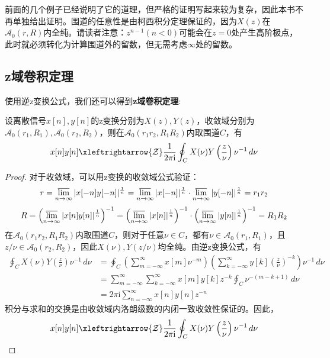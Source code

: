 前面的几个例子已经说明了它的道理，但严格的证明写起来较为复杂，因此本书不再单独给出证明。围道的任意性是由柯西积分定理保证的，因为$X(z)$在$\mathcal{A} _0(r,R)$内全纯。请读者注意：$z^{n-1}(n<0)$可能会在$z=0$处产生高阶极点，此时就必须转化为计算围道外的留数，但无需考虑$\infty$处的留数。

\subsection{z域卷积定理}\label{sub:z_convolution}

使用逆z变换公式，我们还可以得到\textbf{z域卷积定理}:
\begin{theorem}[z域卷积定理]
    设离散信号$x[n],y[n]$的z变换分别为$X(z),Y(z)$，收敛域分别为$\mathcal{A} _0(r_1,R_1),\mathcal{A} _0(r_2,R_2)$，则在$\mathcal{A} _0(r_1 r_2,R_1 R_2)$内取围道$C$，有
    \[x[n]y[n]\xleftrightarrow{\mathcal{Z}} \frac{1}{2\pi \mathrm{i}}\oint_{C}X(\nu)Y\left(\frac{z}{\nu}\right)\nu^{-1}\,d\nu\]
\end{theorem}
\begin{proof}
    对于收敛域，可以用z变换的收敛域公式验证：
    \[r=\varlimsup_{n\to\infty}|x[-n]y[-n]|^{\frac{1}{n}}=\varlimsup_{n\to\infty}|x[-n]|^{\frac{1}{n}}\cdot\varlimsup_{n\to\infty}|y[-n]|^{\frac{1}{n}}=r_1 r_2\]
    \[R=\left(\varlimsup_{n\to\infty}|x[n]y[n]|^{\frac{1}{n}}\right)^{-1}=\left(\varlimsup_{n\to\infty}|x[n]|^{\frac{1}{n}}\right)^{-1}\cdot\left(\varlimsup_{n\to\infty}|y[n]|^{\frac{1}{n}}\right)^{-1}=R_1 R_2\]
    在$\mathcal{A} _0(r_1 r_2,R_1 R_2)$内取围道$C$，则对于任意$\nu\in C$，都有$\nu\in\mathcal{A} _0(r_1,R_1)$，且$z/\nu\in\mathcal{A} _0(r_2,R_2)$，因此$X(\nu),Y(z/\nu)$均全纯。由逆z变换公式，有
    \begin{align*}
        \oint_{C}X(\nu)Y\left(\frac{z}{\nu}\right)\nu^{-1}\,d\nu&=\oint_{C}\left(\sum_{m=-\infty}^{\infty}x[m]\nu^{-m}\right)\left(\sum_{k=-\infty}^{\infty}y[k]\left(\frac{z}{\nu}\right)^{-k}\right)\nu^{-1}\,d\nu\\
        &=\sum_{m=-\infty}^{\infty}\sum_{k=-\infty}^{\infty}x[m]y[k]z^{-k}\oint_{C}\nu^{-(m-k+1)}\,d\nu\\
        &=2\pi \mathrm{i} \sum_{n=-\infty}^{\infty}x[n]y[n]z^{-n}
    \end{align*}
    积分与求和的交换是由收敛域内洛朗级数的内闭一致收敛性保证的。因此，
    \[x[n]y[n]\xleftrightarrow{\mathcal{Z}} \frac{1}{2\pi \mathrm{i}}\oint_{C}X(\nu)Y\left(\frac{z}{\nu}\right)\nu^{-1}\,d\nu\]
\end{proof}

